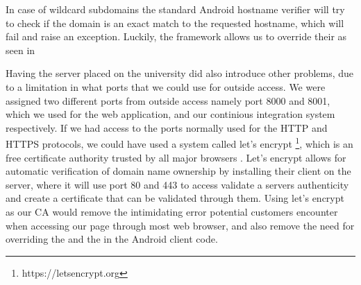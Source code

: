 \FloatBarrier

In case of wildcard subdomains the standard Android hostname verifier will try to check if the domain is an exact match to the requested hostname, which will fail and raise an exception. Luckily, the framework allows us to override their  as seen in 


Having the server placed on the university did also introduce other problems, due to a limitation in what ports that we could use for outside access. 
We were assigned two different ports from outside access namely port 8000 and 8001, which we used for the web application, and our continious integration system respectively. 
If we had access to the ports normally used for the HTTP and HTTPS protocols, we could have used a system called let's encrypt \footnote{https://letsencrypt.org}, which is an free certificate authority trusted by all major browsers \parencite{lets_encrypt_all_browsers}. Let's encrypt allows for automatic verification of domain name ownership by installing their client on the server, where it will use port 80 and 443 to access validate a servers authenticity and create a certificate that can be validated through them. Using let's encrypt as our CA would remove the intimidating error potential customers encounter when accessing our page through most web browser, and also remove the need for overriding the  and the  in the Android client code.